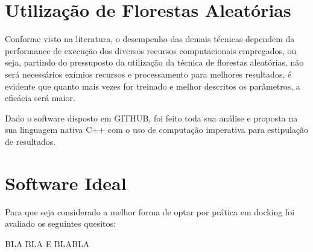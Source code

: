 \documentclass[tcc, capa]{texucpel}
\begin{document}
\section{Utilização de Florestas Aleatórias}
Conforme visto na literatura, o desempenho das demais técnicas dependem da performance de execução dos diversos recursos computacionais empregados, ou seja, partindo do pressuposto da utilização da técnica de florestas aleatórias, não será necessários exímios recursos e processamento para melhores resultados, é evidente que quanto mais vezes for treinado e melhor descritos os parâmetros, a eficácia será maior.

Dado o software disposto em GITHUB, foi feito toda sua análise e proposta na sua linguagem nativa C++ com o uso de computação imperativa para estipulação de resultados.

\section{Software Ideal}

Para que seja considerado a melhor forma de optar por prática em docking foi avaliado os seguintes quesitos:

BLA
BLA
E BLABLA

\end{document}
